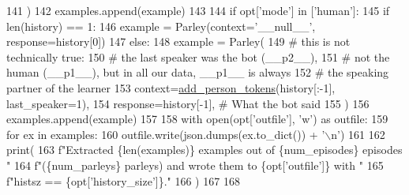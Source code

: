 \begin{DoxyCode}
141                     )
142                 examples.append(example)
143 
144             \textcolor{keywordflow}{if} opt[\textcolor{stringliteral}{'mode'}] \textcolor{keywordflow}{in} [\textcolor{stringliteral}{'human'}]:
145                 \textcolor{keywordflow}{if} len(history) == 1:
146                     example = Parley(context=\textcolor{stringliteral}{'\_\_null\_\_'}, response=history[0])
147                 \textcolor{keywordflow}{else}:
148                     example = Parley(
149                         \textcolor{comment}{# this is not technically true:}
150                         \textcolor{comment}{# the last speaker was the bot (\_\_p2\_\_),}
151                         \textcolor{comment}{# not the human (\_\_p1\_\_), but in all our data, \_\_p1\_\_ is always}
152                         \textcolor{comment}{# the speaking partner of the learner}
153                         context=\hyperlink{namespaceprojects_1_1self__feeding_1_1utils_a3f3d055dc6c4058057baae7b240de5ec}{add\_person\_tokens}(history[:-1], last\_speaker=1),
154                         response=history[-1],  \textcolor{comment}{# What the bot said}
155                     )
156                 examples.append(example)
157 
158     with open(opt[\textcolor{stringliteral}{'outfile'}], \textcolor{stringliteral}{'w'}) \textcolor{keyword}{as} outfile:
159         \textcolor{keywordflow}{for} ex \textcolor{keywordflow}{in} examples:
160             outfile.write(json.dumps(ex.to\_dict()) + \textcolor{stringliteral}{'\(\backslash\)n'})
161 
162     print(
163         f\textcolor{stringliteral}{"Extracted \{len(examples)\} examples out of \{num\_episodes\} episodes "}
164         f\textcolor{stringliteral}{"(\{num\_parleys\} parleys) and wrote them to \{opt['outfile']\} with "}
165         f\textcolor{stringliteral}{"histsz == \{opt['history\_size']\}."}
166     )
167 
168 
\end{DoxyCode}
\mbox{\label{namespaceprojects_1_1self__feeding_1_1scripts_1_1convert__chatted__to__unfiltered_a0c8516f372e45778279d5e8dd120d508}} 
